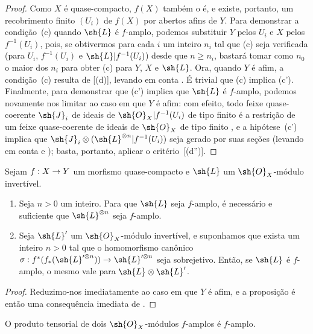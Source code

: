 \documentclass[oneside,10pt]{amsart}
\makeatletter
\renewcommand{\geq}{\geqslant}
\newcommand{\ega@arrow}[2]{\mathchoice{#1}{#2}{#2}{#2}}
\renewcommand{\to}{\ega@arrow{\longrightarrow}{\rightarrow}}
\newcommand{\oldpage}[2][]{\marginnote{\normalfont\footnotesize\textbf{#1}~|~#2}\ignorespaces}
\let\EGAOriginalLabel\label
\renewcommand{\label}[1]{\phantomsection\EGAOriginalLabel{#1}}
\makeatother
\begin{document}
\begin{proof}
Como $X$ é quase-compacto, $f(X)$ também o é, e existe, portanto, um recobrimento finito $(U_i)$ de $f(X)$ por abertos afins de $Y$.
Para demonstrar a condição~(c) quando $\sh{L}$ é $f$-amplo, podemos substituir $Y$ pelos $U_i$ e $X$ pelos $f^{-1}(U_i)$, pois, se obtivermos para cada $i$ um inteiro $n_i$ tal que (c) seja verificada (para $U_i$, $f^{-1}(U_i)$ e $\sh{L}|f^{-1}(U_i)$) desde que $n\geq n_i$, bastará tomar como $n_0$ o maior dos $n_i$ para obter (c) para $Y$, $X$ e $\sh{L}$.
Ora, quando $Y$ é afim, a condição~(c) resulta de [(d)], levando em conta .
É trivial que (c) implica (c').
Finalmente, para demonstrar que (c') implica que $\sh{L}$ é $f$-amplo, podemos novamente nos limitar ao caso em que $Y$ é afim:
com efeito, todo feixe quase-coerente $\sh{J}_i$ de ideais de $\sh{O}_X|f^{-1}(U_i)$ de tipo finito é a restrição de um feixe quase-coerente de ideais de $\sh{O}_X$ de tipo finito , e a hipótese~(c') implica que
\oldpage[II]{91}
$\sh{J}_i\otimes(\sh{L}^{\otimes n}|f^{-1}(U_i))$ seja gerado por suas seções (levando em conta  e );
basta, portanto, aplicar o critério~[(d'')].
\end{proof}

\begin{proposition}[4.6.9]
\label{II.4.6.9}
Sejam $f:X\to Y$ um morfismo quase-compacto e $\sh{L}$ um $\sh{O}_X$-módulo invertível.
\begin{enumerate}
  \item[\rm{(i)}] Seja $n>0$ um inteiro.
    Para que $\sh{L}$ seja $f$-amplo, é necessário e suficiente que $\sh{L}^{\otimes n}$ seja $f$-amplo.
  \item[\rm{(ii)}] Seja $\sh{L}'$ um $\sh{O}_X$-módulo invertível, e suponhamos que exista um inteiro $n>0$ tal que o homomorfismo canônico $\sigma:f^*(f_*(\sh{L}'^{\otimes n}))\to\sh{L}'^{\otimes n}$ seja sobrejetivo.
    Então, se $\sh{L}$ é $f$-amplo, o mesmo vale para $\sh{L}\otimes\sh{L}'$.
\end{enumerate}
\end{proposition}

\begin{proof}
Reduzimo-nos imediatamente ao caso em que $Y$ é afim, e a proposição é então uma consequência imediata de .
\end{proof}

\begin{corollary}[4.6.10]
\label{II.4.6.10}
O produto tensorial de dois $\sh{O}_X$-módulos $f$-amplos é $f$-amplo.
\end{corollary}
\end{document}
